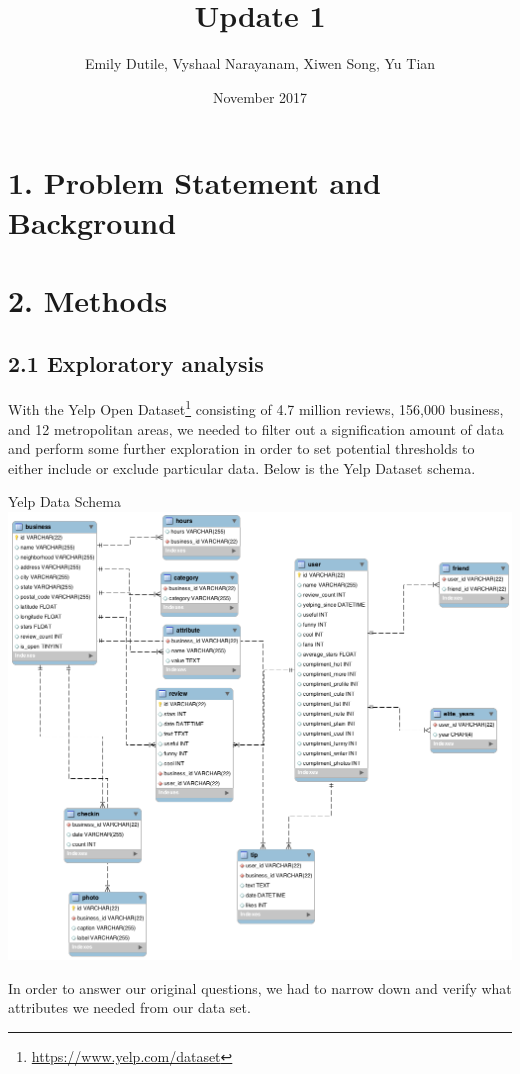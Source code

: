 \documentclass{neu_handout}
\title{Update 1}
\author{Emily Dutile, Vyshaal Narayanam, Xiwen Song, Yu Tian}
\date{November 2017}
\begin{document}
\section*{1. Problem Statement and Background}


\section*{2. Methods}
\subsection*{2.1 Exploratory analysis}
With the Yelp Open Dataset\footnote{\url{https://www.yelp.com/dataset}} consisting of 4.7 million reviews, 156,000 business, and 12 metropolitan areas, we needed to filter out a signification amount of data and perform some further exploration in order to set potential thresholds to either include or exclude particular data. Below is the Yelp Dataset schema.

\begin{center}
Yelp Data Schema\\
\includegraphics[width=150mm,scale=0.5]{schema}\\
\end{center}

In order to answer our original questions, we had to narrow down and verify what attributes we needed from our data set.\\
\end{document}
